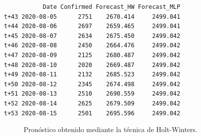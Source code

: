 \documentclass[
  us-letterpaper,
]{scrreprt}
\theoremstyle{plain}
\theoremstyle{definition}
\theoremstyle{definition}
\theoremstyle{plain}
\theoremstyle{remark}
\begin{document}
\newpage{}

\begin{verbatim}
           Date Confirmed Forecast_HW Forecast_MLP
t+43 2020-08-05      2751    2670.414     2499.041
t+44 2020-08-06      2697    2659.465     2499.041
t+45 2020-08-07      2634    2675.450     2499.042
t+46 2020-08-08      2450    2664.476     2499.042
t+47 2020-08-09      2125    2680.487     2499.042
t+48 2020-08-10      2020    2669.487     2499.042
t+49 2020-08-11      2132    2685.523     2499.042
t+50 2020-08-12      2345    2674.498     2499.042
t+51 2020-08-13      2510    2690.559     2499.042
t+52 2020-08-14      2625    2679.509     2499.042
t+53 2020-08-15      2501    2695.596     2499.042
\end{verbatim}

\begin{figure}


\caption{\label{fig-phw}Pronóstico obtenido mediante la técnica de
Holt-Winters.}

\end{figure}%
\end{document}
